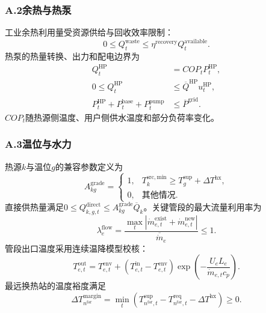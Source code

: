 \subsubsection*{A.2\quad 余热与热泵}

工业余热利用量受资源供给与回收效率限制：
\begin{equation}
0\leq Q_t^{\mathrm{waste}}\leq\eta^{\mathrm{recovery}}Q_t^{\mathrm{available}}.
\end{equation}
热泵的热量转换、出力和配电边界为
\begin{align}
Q_t^{\mathrm{HP}}&=COP_tP_t^{\mathrm{HP}},\\
0\leq Q_t^{\mathrm{HP}}&\leq\overline Q^{\mathrm{HP}}u_t^{\mathrm{HP}},\\
P_t^{\mathrm{HP}}+P_t^{\mathrm{base}}+P_t^{\mathrm{pump}}&\leq\overline P^{\mathrm{grid}}.
\end{align}
$COP_t$随热源侧温度、用户侧供水温度和部分负荷率变化。

\subsubsection*{A.3\quad 温位与水力}

热源$k$与温位$g$的兼容参数定义为
\begin{equation}
A_{kg}^{\mathrm{grade}}=
\begin{cases}
1,&T_k^{\mathrm{src,min}}\geq T_g^{\mathrm{sup}}+\Delta T^{\mathrm{hx}},\\
0,&\text{其他情况}.
\end{cases}
\end{equation}
直接供热量满足$0\leq Q_{k,g,t}^{\mathrm{direct}}\leq A_{kg}^{\mathrm{grade}}\overline Q_k$。关键管段的最大流量利用率为
\begin{equation}
\lambda_e^{\mathrm{flow}}=
\frac{\max_t|\dot m_{e,t}^{\mathrm{exist}}+\dot m_{e,t}^{\mathrm{new}}|}{\overline{\dot m}_e}\leq1.
\end{equation}
管段出口温度采用连续温降模型校核：
\begin{equation}
T_{e,t}^{\mathrm{out}}=T_{e,t}^{\mathrm{env}}+
(T_{e,t}^{\mathrm{in}}-T_{e,t}^{\mathrm{env}})
\exp\left(-\frac{U_eL_e}{\dot m_{e,t}c_p}\right).
\end{equation}
最远换热站的温度裕度满足
\begin{equation}
\Delta T_{n^{\mathrm{far}}}^{\mathrm{margin}}=
\min_t\left(T_{n^{\mathrm{far}},t}^{\mathrm{sup}}-T_{n^{\mathrm{far}},t}^{\mathrm{req}}-\Delta T^{\mathrm{hx}}\right)\geq0.
\end{equation}

